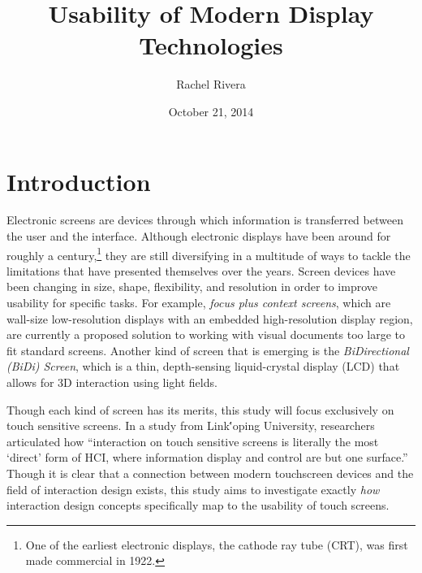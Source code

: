 \documentclass[11pt]{article}
\title{Usability of Modern Display Technologies}
\author{Rachel Rivera}
\date{October 21, 2014}
\begin{document}
\maketitle




\pagebreak
\tableofcontents



\pagebreak


\section{Introduction}
\label{introduction}

Electronic screens are devices through which information is transferred between the user and the interface. Although electronic displays have been around for roughly a century,\footnote{One of the earliest electronic displays, the cathode ray tube (CRT),  was first made commercial in 1922.\cite{Cathode}} they are still diversifying in a multitude of ways to tackle the limitations that have presented themselves over the years.\cite{Eisenberg} Screen devices have been changing in size, shape, flexibility, and resolution in order to improve usability for specific tasks. For example, \textit{focus plus context screens}, which are wall-size low-resolution displays with an embedded high-resolution display region, are currently a proposed solution to working with visual documents too large to fit standard screens.\cite{Baudisch} Another kind of screen that is emerging is the \textit{BiDirectional (BiDi) Screen}, which is a thin, depth-sensing liquid-crystal display (LCD) that allows for 3D interaction using light fields.\cite{Hirsch} 

 Though each kind of screen has its merits, this study will focus exclusively on touch sensitive screens. In a study from Link\''{o}ping University, researchers articulated how ``interaction on touch sensitive screens is literally the most `direct' form of HCI, where information display and control are but one surface.''\cite{Albinsson} Though it is clear that a connection between modern touchscreen devices and the field of interaction design exists, this study aims to investigate exactly \textit{how} interaction design concepts specifically map to the usability of touch screens. 
\end{document}
